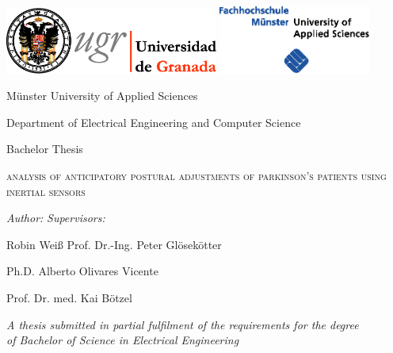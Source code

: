 \begin{titlepage}
\label{ch:titlepage}

\begin{center}

\includegraphics[width=7cm]{images/universidad_de_granada.eps}
	\hfill
\includegraphics[width=5cm]{images/fh-muenster.eps}
	\hspace{0.3cm} 

\vspace{3cm}

{\large Münster University of Applied Sciences}

Department of Electrical Engineering and Computer Science

\vspace{1cm}

{\Large Bachelor Thesis}

\vspace{1cm}

\textsc{\huge analysis of anticipatory postural 
\vspace{0.15cm}
adjustments of parkinson's patients using inertial sensors}

\end{center}

\vspace{1cm}

\textit{Author:}  \hfill \textit{Supervisors:}

Robin Weiß \hfill Prof. Dr.-Ing. Peter Gl\"{o}sek\"{o}tter 

\hfill Ph.D. Alberto Olivares Vicente

\hfill Prof. Dr. med. Kai B\"{o}tzel

\vspace{1cm}

\begin{center}
	
\textit{A thesis submitted in partial fulfilment of the requirements for the degree\\
of Bachelor of Science in Electrical Engineering}

\vfill

\monthname \: \the\year 

\end{center}

\end{titlepage}

